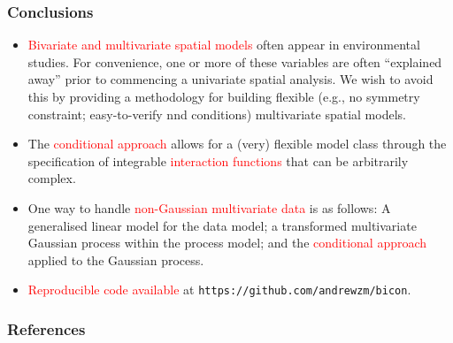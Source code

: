 \documentclass{beamer}
\newcommand{\red}{\textcolor{red}}%
\begin{document}


\begin{frame}
\frametitle{Conclusions}
\vspace{-.8cm}
\begin{itemize}
\item \textcolor{red}{Bivariate and multivariate spatial models} often appear in environmental studies. For convenience, one or more of these variables are often ``explained away'' prior to commencing a univariate spatial analysis. We wish to avoid this by providing a methodology for building flexible (e.g., no symmetry constraint; easy-to-verify nnd conditions) multivariate spatial models.
\item The \textcolor{red}{conditional approach} allows for a (very) flexible model class through the specification of integrable \textcolor{red}{interaction functions} that can be arbitrarily complex.
\item One way to handle \textcolor{red}{non-Gaussian multivariate data} is as follows: A generalised linear model for the data model;  a transformed multivariate Gaussian process within the process model; and the \textcolor{red}{conditional approach} applied to the Gaussian process.
\item \red{Reproducible code available} at \texttt{https://github.com/andrewzm/bicon}.
\end{itemize}
\end{frame}

\small

\begin{frame}[allowframebreaks]
\frametitle{References}


\vspace{-1cm}



\end{frame}
\end{document}
